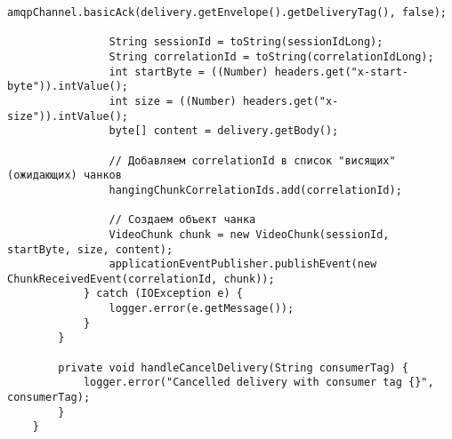 \begin{lstlisting}[caption={ChunkConsumerService.java}]
				amqpChannel.basicAck(delivery.getEnvelope().getDeliveryTag(), false);
				
				String sessionId = toString(sessionIdLong);
				String correlationId = toString(correlationIdLong);
				int startByte = ((Number) headers.get("x-start-byte")).intValue();
				int size = ((Number) headers.get("x-size")).intValue();
				byte[] content = delivery.getBody();
				
				// Добавляем correlationId в список "висящих" (ожидающих) чанков
				hangingChunkCorrelationIds.add(correlationId);
				
				// Создаем объект чанка
				VideoChunk chunk = new VideoChunk(sessionId, startByte, size, content);
				applicationEventPublisher.publishEvent(new ChunkReceivedEvent(correlationId, chunk));
			} catch (IOException e) {
				logger.error(e.getMessage());
			}
		}
		
		private void handleCancelDelivery(String consumerTag) {
			logger.error("Cancelled delivery with consumer tag {}", consumerTag);
		}
	}
\end{lstlisting}

